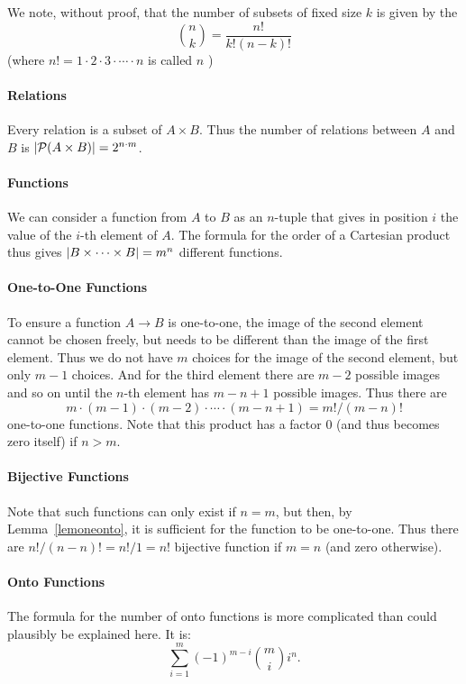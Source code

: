 We note, without proof, that the number of subsets of fixed size $k$ is given by the
\[
{n\choose k}=\frac{n!}{k!(n-k)!}
\]
(where $n!=1\cdot 2\cdot 3\cdot\cdots\cdot n$ is called $n$ )

\paragraph{Relations}
Every relation is a subset of $A\times B$. Thus the number of relations between $A$ and
$B$ is $\left|{\mathcal P}(A\times B)\right|=2^{n\cdot m}$.

\paragraph{Functions}
We can consider a function from $A$ to $B$ as an $n$-tuple that gives in position $i$
the value of the $i$-th element of $A$. The formula for the order of a Cartesian product
thus gives $\left|B\times \cdots\times B\right|=m^n$ different functions.

\paragraph{One-to-One Functions}
To ensure a function $A\to B$ is one-to-one, the image of the second element cannot be chosen
freely, but needs to be different than the image of the first element. Thus we do not
have $m$ choices for the image of the second element, but only $m-1$ choices. And for the third element there are $m-2$
possible images and so on until the $n$-th element has $m-n+1$ possible images. Thus there are
\[
m\cdot (m-1)\cdot (m-2)\cdot \cdots\cdot (m-n+1)=m!/(m-n)!
\]
one-to-one functions. Note that this product has a factor $0$ (and thus becomes zero
itself) if $n>m$.

\paragraph{Bijective Functions}
Note that such functions can only exist if $n=m$, but then, by Lemma~\ref{lemoneonto},
it is sufficient for the function to be one-to-one. Thus there
are
$n!/(n-n)!=n!/1=n!$
bijective function if $m=n$ (and zero otherwise).

\paragraph{Onto Functions}
The formula for the number of onto functions is more complicated than could plausibly be
explained here. It is:
\[
\sum_{i=1}^m (-1)^{m-i}{m\choose i}i^n.
\]


